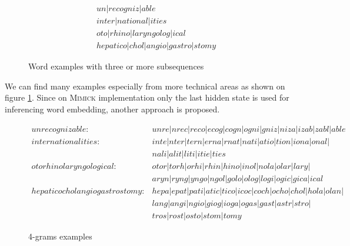         \begin{figure}
            \begin{align*}
                &un \vert recogniz \vert able \\
                &inter \vert national \vert ities \\
                &oto \vert rhino \vert laryngolog \vert ical \\
                &hepatico \vert chol \vert angio \vert gastro \vert stomy
            \end{align*}
            \caption{Word examples with three or more subsequences}
            \label{fig:subsequence}
        \end{figure}

        We can find many examples especially from more technical areas
        as shown on figure \ref{fig:subsequence}. Since on
        \textsc{Mimick} \cite{mimicking2017Pinter} implementation only
        the last hidden state is used for inferencing word embedding,
        another approach is proposed.

        \begin{figure}
            \begin{align*}
                unrecognizable : &unre \vert nrec \vert reco \vert ecog \vert cogn \vert ogni \vert gniz \vert niza \vert izab \vert zabl \vert able\\
                internationalities : &inte \vert nter \vert tern \vert erna \vert rnat \vert nati \vert atio \vert tion \vert iona \vert onal \vert \\
                &nali \vert alit \vert liti \vert itie \vert ties\\
                otorhinolaryngological : &otor \vert torh \vert orhi \vert rhin \vert hino \vert inol \vert nola \vert olar \vert lary \vert \\
                &aryn \vert ryng \vert yngo \vert ngol \vert golo \vert olog \vert logi \vert ogic \vert gica \vert ical\\
                hepaticocholangiogastrostomy : &hepa \vert epat \vert pati \vert atic \vert tico \vert icoc \vert coch \vert ocho \vert chol \vert hola \vert olan \vert\\
                &lang \vert angi \vert ngio \vert giog \vert ioga \vert ogas \vert gast \vert astr \vert stro \vert\\
                &tros \vert rost \vert osto \vert stom \vert tomy
            \end{align*}
            \caption{4-grams examples}
            \label{fig:4grams}
        \end{figure}

